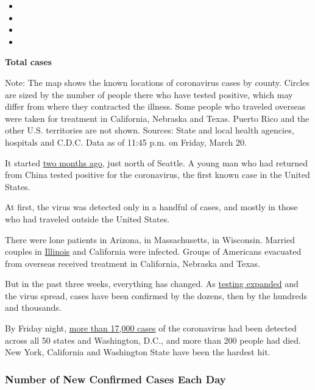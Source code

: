 \begin{itemize}
\item
\item
\item
\item
\end{itemize}

\textbf{Total cases}

Note: The map shows the known locations of coronavirus cases by county.
Circles are sized by the number of people there who have tested
positive, which may differ from where they contracted the illness. Some
people who traveled overseas were taken for treatment in California,
Nebraska and Texas. Puerto Rico and the other U.S. territories are not
shown. Sources: State and local health agencies, hospitals and C.D.C.
Data as of 11:45 p.m. on Friday, March 20.

It started
\href{https://www.nytimes3xbfgragh.onion/2020/01/21/health/cdc-coronavirus.html}{two
months ago}, just north of Seattle. A young man who had returned from
China tested positive for the coronavirus, the first known case in the
United States.

At first, the virus was detected only in a handful of cases, and mostly
in those who had traveled outside the United States.

There were lone patients in Arizona, in Massachusetts, in Wisconsin.
Married couples in
\href{https://www.nytimes3xbfgragh.onion/2020/01/24/health/chicago-coronavirus-cdc.html}{Illinois}
and California were infected. Groups of Americans evacuated from
overseas received treatment in California, Nebraska and Texas.

But in the past three weeks, everything has changed. As
\href{https://www.nytimes3xbfgragh.onion/2020/03/13/us/politics/trump-administration-coronavirus-testing.html}{testing
expanded} and the virus spread, cases have been confirmed by the dozens,
then by the hundreds and thousands.

By Friday night,
\href{https://www.nytimes3xbfgragh.onion/interactive/2020/world/coronavirus-maps.html\#us}{more
than 17,000 cases} of the coronavirus had been detected across all 50
states and Washington, D.C., and more than 200 people had died. New
York, California and Washington State have been the hardest hit.

\hypertarget{number-of-new-confirmed-cases-each-day}{%
\subsubsection{Number of New Confirmed Cases Each
Day}\label{number-of-new-confirmed-cases-each-day}}

